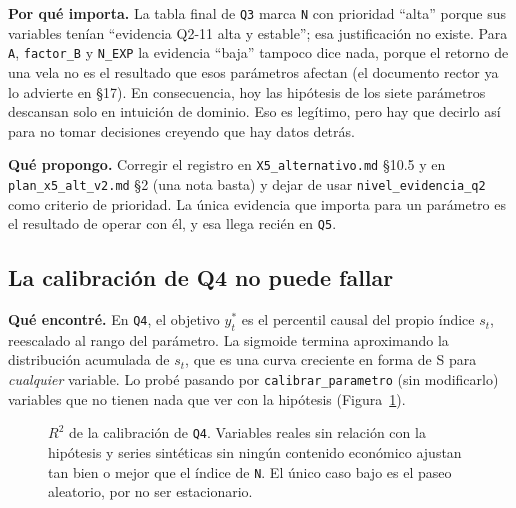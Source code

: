 \documentclass[11pt,a4paper]{article}
\newcommand{\code}[1]{\texttt{\small #1}}
\begin{document}
\textbf{Por qué importa.} La tabla final de \code{Q3} marca \code{N} con prioridad ``alta'' porque sus
variables tenían ``evidencia Q2-11 alta y estable''; esa justificación no existe. Para \code{A},
\code{factor\_B} y \code{N\_EXP} la evidencia ``baja'' tampoco dice nada, porque el retorno de una vela
no es el resultado que esos parámetros afectan (el documento rector ya lo advierte en §17). En
consecuencia, hoy las hipótesis de los siete parámetros descansan solo en intuición de dominio. Eso es
legítimo, pero hay que decirlo así para no tomar decisiones creyendo que hay datos detrás.

\textbf{Qué propongo.} Corregir el registro en \code{X5\_alternativo.md} §10.5 y en
\code{plan\_x5\_alt\_v2.md} §2 (una nota basta) y dejar de usar \code{nivel\_evidencia\_q2} como criterio
de prioridad. La única evidencia que importa para un parámetro es el resultado de operar con él, y esa
llega recién en \code{Q5}.

\subsection{La calibración de Q4 no puede fallar}\label{sec:q4}

\textbf{Qué encontré.} En \code{Q4}, el objetivo $y^*_t$ es el percentil causal del propio índice
$s_t$, reescalado al rango del parámetro. La sigmoide termina aproximando la distribución acumulada de
$s_t$, que es una curva creciente en forma de S para \emph{cualquier} variable. Lo probé pasando por
\code{calibrar\_parametro} (sin modificarlo) variables que no tienen nada que ver con la hipótesis
(Figura~\ref{fig:r2}).

\begin{figure}[h]
\centering
{}
\caption{$R^2$ de la calibración de \code{Q4}. Variables reales sin relación con la hipótesis y series
sintéticas sin ningún contenido económico ajustan tan bien o mejor que el índice de \code{N}. El único
caso bajo es el paseo aleatorio, por no ser estacionario.}
\label{fig:r2}
\end{figure}
\end{document}
